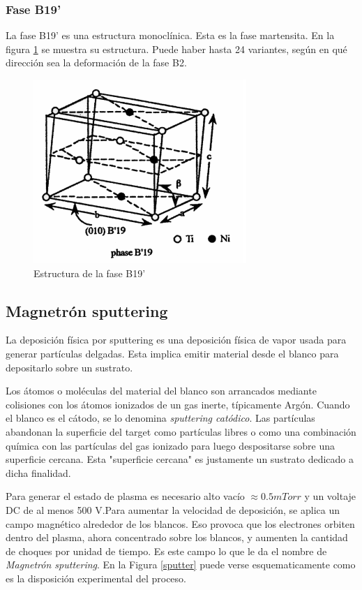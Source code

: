 \documentclass{article}
\theoremstyle{definition}
\theoremstyle{remark}
\begin{document}
\subsubsection{Fase B19'}
La fase B19' es una estructura monoclínica. Esta es la fase martensita. En la figura \ref{B19pPhase} se muestra su estructura. Puede haber hasta 24 variantes, según en qué dirección sea la deformación de la fase B2.
\begin{figure}[H]
	\centering
	\includegraphics[scale=0.4]{img/B19pPhase.png}
	\caption{Estructura de la fase B19'}
	\label{B19pPhase}
\end{figure}

\subsection{Magnetrón sputtering}
La deposición física por sputtering es una deposición física de vapor usada para generar partículas delgadas. Esta implica emitir material desde el blanco para depositarlo sobre un sustrato. 

 Los átomos o moléculas del material del blanco son arrancados mediante colisiones con los átomos ionizados de un gas inerte, típicamente Argón. Cuando el blanco es el cátodo, se lo denomina \textit{sputtering catódico}. Las partículas abandonan la superficie del target como partículas libres o como una combinación química con las partículas del gas ionizado para luego despositarse sobre una superficie cercana.  Esta "superficie cercana" es justamente un sustrato dedicado a dicha finalidad.
 
Para generar el estado de plasma es necesario alto vacío $\approx 0.5 mTorr$ y un voltaje DC de al menos 500 V.Para aumentar la velocidad de deposición, se aplica un campo magnético alrededor de los blancos. Eso provoca que los electrones orbiten dentro del plasma, ahora concentrado sobre los blancos, y aumenten la cantidad de choques por unidad de tiempo. Es este campo lo que le da el nombre de \textit{Magnetrón sputtering}\citep{Malvasio}\citep{ThinFilm}. En la Figura \ref{sputter} puede verse esquematicamente como es la disposición experimental del proceso.
\end{document}
